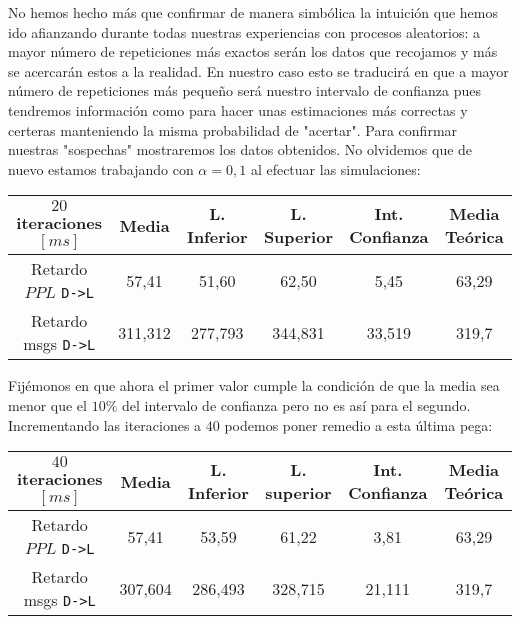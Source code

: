 \documentclass{article}[10pt]
\begin{document}
		No hemos hecho más que confirmar de manera simbólica la intuición que hemos ido afianzando durante todas nuestras experiencias con procesos aleatorios: a mayor número de repeticiones más exactos serán los datos que recojamos y más se acercarán estos a la realidad. En nuestro caso esto se traducirá en que a mayor número de repeticiones más pequeño será nuestro intervalo de confianza pues tendremos información como para hacer unas estimaciones más correctas y certeras manteniendo la misma probabilidad de "acertar". Para confirmar nuestras "sospechas" mostraremos los datos obtenidos. No olvidemos que de nuevo estamos trabajando con $\alpha = 0,1$ al efectuar las simulaciones:

		\vskip 3mm

		\begin{center}
			\begin{tabular}{| c | c | c | c | c | c |}
				\hline
				$20$ iteraciones $[ms]$ & Media & L. Inferior & L. Superior & Int. Confianza & Media Teórica\\
				\hline
				Retardo $PPL$ \texttt{D->L} & 57,41 & 51,60 & 62,50 & 5,45 & 63,29\\
				\hline
				Retardo msgs \texttt{D->L} & 311,312 & 277,793 & 344,831 & 33,519 & 319,7\\
				\hline
			\end{tabular}
		\end{center}

		\vskip 3mm

		Fijémonos en que ahora el primer valor cumple la condición de que la media sea menor que el $10\%$ del intervalo de confianza pero no es así para el segundo. Incrementando las iteraciones a $40$ podemos poner remedio a esta última pega:

		\vskip 3mm

		\begin{center}
			\begin{tabular}{| c | c | c | c | c | c |}
				\hline
				$40$ iteraciones $[ms]$ & Media & L. Inferior & L. superior & Int. Confianza & Media Teórica\\
				\hline
				Retardo $PPL$ \texttt{D->L} & 57,41 & 53,59 & 61,22 & 3,81 & 63,29\\
				\hline
				Retardo msgs \texttt{D->L} & 307,604 & 286,493 & 328,715 & 21,111 & 319,7\\
				\hline
			\end{tabular}
		\end{center}

		\vskip 3mm
\end{document}
